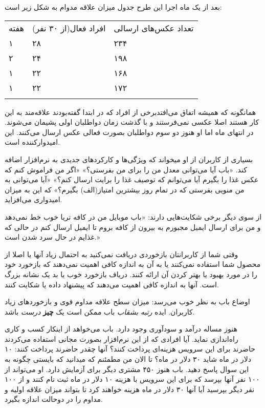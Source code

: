 بعد از یک ماه اجرا این طرح جدول میزان علاقه مدوام به شکل زیر است:

\begin{longtable}[c]{@{}lll@{}}
\toprule\addlinespace
هفته & افراد فعال(از ۳۰ نفر) & تعداد عکس‌های ارسالی
\\\addlinespace
\midrule\endhead
۱ & ۲۸ & ۲۳۴
\\\addlinespace
۲ & ۲۴ & ۱۹۸
\\\addlinespace
۱ & ۲۲ & ۱۶۸
\\\addlinespace
۱ & ۲۲ & ۱۷۲
\\\addlinespace
\bottomrule
\end{longtable}

همانگونه که همیشه اتفاق می‌افتدبرخی از افراد که در ابتدا گفته‌بودند
علاقه‌مند به این کار هستند اصلا عکسی نمی‌فرستند و با گذشت زمان دواطلبان
اولی پشیمان می‌شوند. در انتهای ماه اما او هنوز دو سوم دواطلبان بصورت
فعالی عکس ارسال می‌کنند. این امیدوارکننده است.

بسیاری از کاربران از او میخواند که ویژگی‌ها و کارکردهای جدیدی به
نرم‌افزار اضافه کند. «باب آیا می‌توانی معدل من را برای من بفرستی؟» «اگر
من فراموش کنم که عکس غذا را بگیرم آیا می‌توانم که توصیف غذا را برایت
ارسال کنم؟» «آیا می‌توانی به من منویی بفرستی که در تمام روز بیشترین
امتیاز(الف) بگیرم؟» که این به میزان امیدواری می‌افزاید.

از سوی دیگر برخی شکایت‌هایی دارند: «باب موبایل من در کافه تریا خوب خط
نمی‌دهد و من برای ارسال ایمیل مجبورم به بیرون از کافه بروم تا ایمیل
ارسال کنم در حالی که غذایم در حال سرد شدن است.»

وقتی شما از کاربرانتان بازخوردی دریافت نمی‌کنید به احتمال زیاد آنها یا
اصلا از محصول شما استفاده نمی‌کنند یا به آن به اندازه کافی اهمیت
نمی‌دهند که بازخورد خود را در مورد بهبود یا بهتر کردن آن ارائه کنند.
دریاف بازخورد خوب یا بد یک نشانه بزرگ است. آنها به اندازه کافی اهمیت‌
می‌دهند که پیشنهاد داده یا شکایت کنند.

اوضاع باب به نظر خوب می‌رسد: میزان سطح علاقه مداوم قوی و بازخوردهای زیاد
کاربران. ایده \emph{رتبه بشقاب} باب ممکن است یک \textbf{چیز} \emph{درست}
باشد.

هنوز مساله درآمد و سودآوری وجود دارد. باب می‌خواهد از اینکار کسب و کاری
راه‌اندازی نماید. آیا افرادی که از این نرم‌افزار بصورت مجانی استفاده
می‌کردند حاضرند برای این سرویس هزینه‌ای پرداخت کنند؟ آنها چقدر حاضرند
پرداخت کنند: ۱۰ دلار در ماه شاید ۳۰ دلار در ماه؟ تا الان من مطمئنم که
میدانید که بایستی چگونه به این سوال پاسخ دهید. باب هنوز ۴۵۰ مشتری دیگر
برای آزمایش دارد. او می‌تواند از ۱۰۰ نفر آنها بپرسد که برای این سرویس با
هزینه ۱۰ دلار در ماه ثبت نام کنند و از ۱۰۰ نفر دیگر بپرسید آیا آنها ۳۰
دلار در ماه هزینه خواهند کرد تا بتواند میزان علاقه اولیه و مداوم را در
دوحالت اندازه بگیرد.

